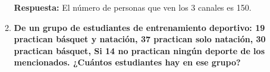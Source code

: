 \documentclass[12pt]{article}
\begin{document}
\begin{enumerate}
\begin{enumerate}
                            
                            \textbf{Respuesta:} El número de personas que ven los 3 canales es 150.

                        \item \textbf{De un grupo de estudiantes de entrenamiento deportivo: 19 practican básquet y natación, 37 practican solo natación, 30 practican básquet, Si 14 no practican ningún deporte de los mencionados. ¿Cuántos estudiantes hay en ese grupo?}
                    \end{enumerate}
            \end{enumerate}    
\end{document}
